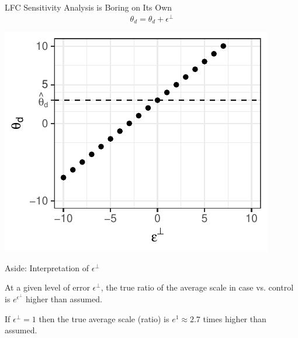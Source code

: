 \documentclass{beamer}
\begin{document}
\begin{frame}[label={sec:org130c059}]{LFC Sensitivity Analysis is Boring on Its Own}
\[\theta_{d}=\hat{\theta}_{d}+\epsilon^{\perp}\]
\vfill
\begin{center}
\includegraphics[width=0.6\linewidth]{da_lfc_sensitivity.pdf}
\label{org19f4bf0}
\end{center}
\end{frame}
\begin{frame}[label={sec:orgc1381d6}]{Aside: Interpretation of \(\epsilon^{\perp}\)}

At a given level of error \(\epsilon^\perp\), the true ratio of the average scale in case vs. control is \(e^{\epsilon^\perp}\) higher than assumed. 

\vfill
\begin{example}[]\label{sec:orgab734cb}
If \(\epsilon^\perp=1\) then the true average scale (ratio) is \(e^{1}\approx 2.7\) times higher than assumed. 
\end{example}
\end{frame}
\end{document}

